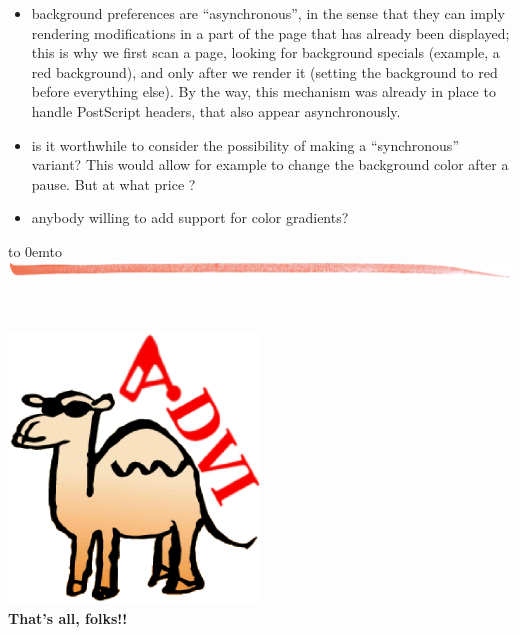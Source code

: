 \documentclass[12pt]{article}
\def\keymenu#1{\textcolor{red}{\underline{#1}}}
\def\advifooter{\vbox to 0em{\vbox to \vsize {\vfill
Press: \keymenu{n}ext page \keymenu{p}revious page
\keymenu{\textvisiblespace} next pause%
\hfill{\adviembed[sticky=advianim,width=1.56cm,height=1.824cm]{animate -geometry !g! -window !p advilogo.anim.gif}}
} \vss}}
\def\adviheader{\noindent
{\bf\Large \ActiveDVI}\\
\includegraphics[width=\textwidth]{../tex/bar.jpg.eps}}
\let \Newpage \newpage
\def \newpage {\Newpage \advifooter\adviheader}
\def\adviemptyfooter{\vbox to 0em{\vbox to \vsize {\vfill
~~\vss\advikillembed{advianim}}}}
\def\lastpage{\Newpage\adviemptyfooter\adviheader}
\begin{document}
  \begin{itemize}
    \item background preferences are ``asynchronous'', in the sense
that they can imply rendering modifications in a part of the page that
has already been displayed; this is why we first scan a page, looking
for background specials (example, a red background), and only after we
render it (setting the background to red before everything else). By
the way, this mechanism was already in place to handle PostScript
headers, that also appear asynchronously.

    \item is it worthwhile to consider the possibility of making a
``synchronous'' variant? This would allow for example to change the
background color after a pause. But at what price ?

    \item anybody willing to add support for color gradients?
  \end{itemize}

\lastpage

~\vfill
\begin{center}
\includegraphics[width=0.5\textwidth]{../tex/advilogo.eps}\\
{\Large \bf That's all, folks!!}
\end{center}
\vfill
\end{document}
